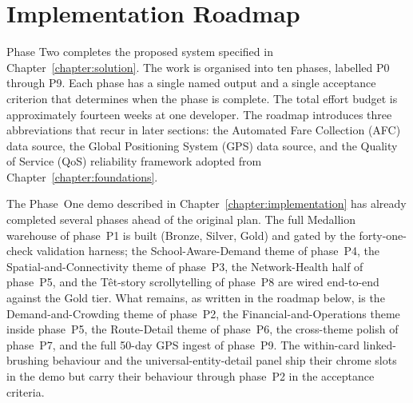 \section{Implementation Roadmap}
\label{sec:future:roadmap}

Phase Two completes the proposed system specified in
Chapter~\ref{chapter:solution}. The work is organised into ten phases,
labelled P0 through P9. Each phase has a single named output and a single
acceptance criterion that determines when the phase is complete. The total
effort budget is approximately fourteen weeks at one developer.
The roadmap introduces three abbreviations that recur in later sections:
the Automated Fare Collection (AFC) data source, the Global Positioning
System (GPS) data source, and the Quality of Service (QoS) reliability
framework adopted from Chapter~\ref{chapter:foundations}.

The Phase~One demo described in Chapter~\ref{chapter:implementation}
has already completed several phases ahead of the original plan. The
full Medallion warehouse of phase~P1 is built (Bronze, Silver, Gold)
and gated by the forty-one-check validation harness; the
School-Aware-Demand theme of phase~P4, the Spatial-and-Connectivity
theme of phase~P3, the Network-Health half of phase~P5, and the
T\^et-story scrollytelling of phase~P8 are wired end-to-end against the
Gold tier. What remains, as written in the roadmap below, is the
Demand-and-Crowding theme of phase~P2, the Financial-and-Operations
theme inside phase~P5, the Route-Detail theme of phase~P6, the
cross-theme polish of phase~P7, and the full 50-day GPS ingest of
phase~P9. The within-card linked-brushing behaviour and the
universal-entity-detail panel ship their chrome slots in the demo
but carry their behaviour through phase~P2 in the acceptance criteria.


